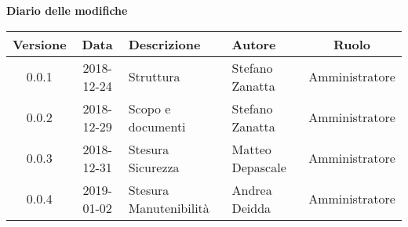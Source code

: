 	\begin{center}
		\textbf{Diario delle modifiche}
	\end{center}
	\begin{center}
		\begin{tabularx}{\textwidth}{|c|c|X|X|c|}
			\hline
			\textbf{Versione} & \textbf{Data} & \textbf{Descrizione} & \textbf{Autore} & \textbf{Ruolo} \\
			\hline
			0.0.1 & 2018-12-24 & Struttura & Stefano Zanatta & Amministratore\\
			0.0.2 & 2018-12-29 & Scopo e documenti & Stefano Zanatta & Amministratore\\
			0.0.3 & 2018-12-31 & Stesura Sicurezza & Matteo Depascale & Amministratore\\
			0.0.4 & 2019-01-02 & Stesura Manutenibilità & Andrea Deidda & Amministratore\\
			\hline
		\end{tabularx}
	\end{center}
\newpage